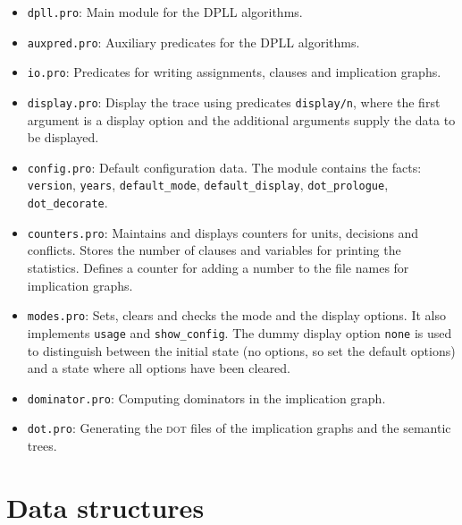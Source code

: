 \documentclass[11pt]{report}
\newcommand*{\p}[1]{\textup{\texttt{#1}}}
\newcommand*{\dt}{\textsc{dot}}
\begin{document}
\begin{itemize}
\item \p{dpll.pro}: Main module for the DPLL algorithms.\\

\item \p{auxpred.pro}: Auxiliary predicates for the DPLL algorithms. 

\item \p{io.pro}: Predicates for writing assignments, clauses and
implication graphs.

\item \p{display.pro}: Display the trace using predicates \p{display/n},
where the first argument is a display option and the additional
arguments supply the data to be displayed.

\item \p{config.pro}: Default configuration data. The module contains
the facts: \p{version}, \p{years}, \p{default\_mode},
\p{default\_display}, \p{dot\_prologue}, \p{dot\_decorate}.

\item \p{counters.pro}: Maintains and displays counters for units,
decisions and conflicts. Stores the number of clauses and variables for
printing the statistics. Defines a counter for adding a number to the
file names for implication graphs.

\item \p{modes.pro}: Sets, clears and checks the mode and the display
options. It also implements \p{usage} and \p{show\_config}. The dummy
display option \p{none} is used to distinguish between the initial state
(no options, so set the default options) and a state where all options
have been cleared.

\item \p{dominator.pro}: Computing dominators in the implication graph. 

\item \p{dot.pro}: Generating the \dt{} files of the implication graphs
and the semantic trees.
\end{itemize}

\newpage

\section{Data structures}
\end{document}
